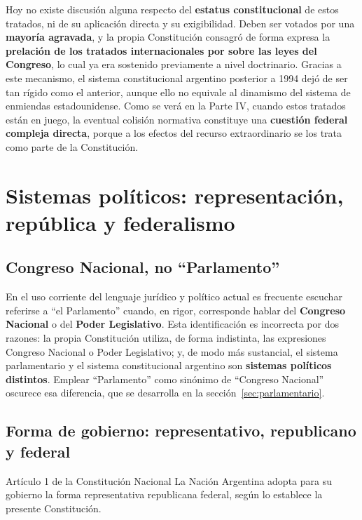 \documentclass[12pt,oneside]{book}
\begin{document}
Hoy no existe discusión alguna respecto del \textbf{estatus constitucional} de estos tratados, ni de su aplicación directa y su exigibilidad. Deben ser votados por una \textbf{mayoría agravada}, y la propia Constitución consagró de forma expresa la \textbf{prelación de los tratados internacionales por sobre las leyes del Congreso}, lo cual ya era sostenido previamente a nivel doctrinario. Gracias a este mecanismo, el sistema constitucional argentino posterior a 1994 dejó de ser tan rígido como el anterior, aunque ello no equivale al dinamismo del sistema de enmiendas estadounidense. Como se verá en la Parte IV, cuando estos tratados están en juego, la eventual colisión normativa constituye una \textbf{cuestión federal compleja directa}, porque a los efectos del recurso extraordinario se los trata como parte de la Constitución.

\chapter[Sistemas políticos]{Sistemas políticos: representación, república y federalismo}

\section{Congreso Nacional, no ``Parlamento''}

En el uso corriente del lenguaje jurídico y político actual es frecuente escuchar referirse a ``el Parlamento'' cuando, en rigor, corresponde hablar del \textbf{Congreso Nacional} o del \textbf{Poder Legislativo}. Esta identificación es incorrecta por dos razones: la propia Constitución utiliza, de forma indistinta, las expresiones Congreso Nacional o Poder Legislativo; y, de modo más sustancial, el sistema parlamentario y el sistema constitucional argentino son \textbf{sistemas políticos distintos}. Emplear ``Parlamento'' como sinónimo de ``Congreso Nacional'' oscurece esa diferencia, que se desarrolla en la sección~\ref{sec:parlamentario}.

\section{Forma de gobierno: representativo, republicano y federal}

\begin{norma}{Artículo 1 de la Constitución Nacional}
La Nación Argentina adopta para su gobierno la forma representativa republicana federal, según lo establece la presente Constitución.
\end{norma}
\end{document}
